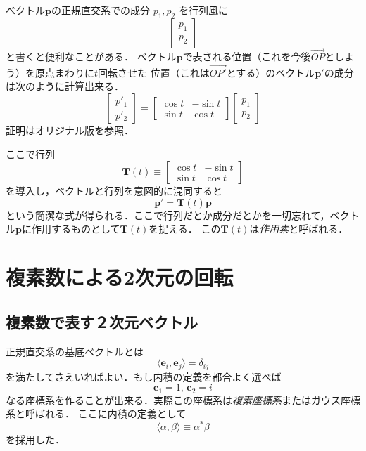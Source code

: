 \documentclass{jsbook}
\newcommand{\keyword}[1]{\emph{#1}}
\newcommand{\bvec}[1]{\boldsymbol{#1}}
\newcommand{\bop}[1]{\boldsymbol{#1}}
\newcommand{\im}{i}%
\newcommand{\ve}{\bvec{e}}
\begin{document}
ベクトル$\bvec{p}$の正規直交系での成分 $p_1,p_2$ を行列風に
\begin{equation}
\begin{bmatrix}p_1\\p_2\end{bmatrix}
\end{equation}
と書くと便利なことがある．
ベクトル$\bvec{p}$で表される位置（これを今後$\overrightarrow{OP}$としよう）を原点まわりに$t$回転させた
位置（これは$\overrightarrow{OP'}$とする）のベクトル$\bvec{p}'$の成分は次のように計算出来る．
\begin{equation}
\begin{bmatrix}p'_1\\p'_2\end{bmatrix}=\begin{bmatrix}\cos t&-\sin t\\\sin t&\cos t\end{bmatrix}\begin{bmatrix}p_1\\p_2\end{bmatrix}
\end{equation}
証明はオリジナル版を参照．

ここで行列
\begin{equation}
\bop{T}(t)\equiv\begin{bmatrix}\cos t&-\sin t\\\sin t&\cos t\end{bmatrix}
\end{equation}
を導入し，ベクトルと行列を意図的に混同すると
\begin{equation}
\bvec{p}'=\bop{T}(t)\bvec{p}
\end{equation}
という簡潔な式が得られる．ここで行列だとか成分だとかを一切忘れて，ベクトル$\bvec{p}$に作用するものとして$\bop{T}(t)$を捉える．
この$\bop{T}(t)$は\keyword{作用素}と呼ばれる．

\section{複素数による2次元の回転}

\subsection{複素数で表す２次元ベクトル}

正規直交系の基底ベクトルとは
\begin{equation}
\langle\ve_i,\ve_j\rangle=\delta_{ij}
\end{equation}
を満たしてさえいればよい．もし内積の定義を都合よく選べば
\begin{equation}
\ve_1=1,\,\ve_2=\im
\end{equation}
なる座標系を作ることが出来る．実際この座標系は\keyword{複素座標系}またはガウス座標系と呼ばれる．
ここに内積の定義として
\begin{equation}
\langle\alpha,\beta\rangle\equiv\alpha^*\beta
\end{equation}
を採用した．
\end{document}
